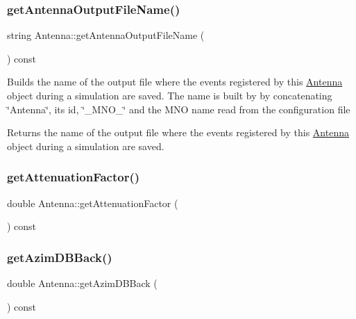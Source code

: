 \mbox{\label{class_antenna_a7a3919b137b91c1f8f13d620bc7657ed}} 
\subsubsection{\texorpdfstring{get\+Antenna\+Output\+File\+Name()}{getAntennaOutputFileName()}}
{\footnotesize\ttfamily string Antenna\+::get\+Antenna\+Output\+File\+Name (\begin{DoxyParamCaption}{ }\end{DoxyParamCaption}) const}

Builds the name of the output file where the events registered by this \hyperlink{class_antenna}{Antenna} object during a simulation are saved. The name is built by by concatenating \char`\"{}\+Antenna\char`\"{}, its id, \char`\"{}\+\_\+\+M\+N\+O\+\_\+\char`\"{} and the M\+NO name read from the configuration file \begin{DoxyReturn}{Returns}
the name of the output file where the events registered by this \hyperlink{class_antenna}{Antenna} object during a simulation are saved. 
\end{DoxyReturn}
\mbox{\label{class_antenna_a9551ed22d25c51210913de4a3074d9eb}} 
\subsubsection{\texorpdfstring{get\+Attenuation\+Factor()}{getAttenuationFactor()}}
{\footnotesize\ttfamily double Antenna\+::get\+Attenuation\+Factor (\begin{DoxyParamCaption}{ }\end{DoxyParamCaption}) const\hspace{0.3cm}{\ttfamily [private]}}

\mbox{\label{class_antenna_a1354b8be09c0985c3710a8c91ee11dd6}} 
\subsubsection{\texorpdfstring{get\+Azim\+D\+B\+Back()}{getAzimDBBack()}}
{\footnotesize\ttfamily double Antenna\+::get\+Azim\+D\+B\+Back (\begin{DoxyParamCaption}{ }\end{DoxyParamCaption}) const\hspace{0.3cm}{\ttfamily [private]}}

